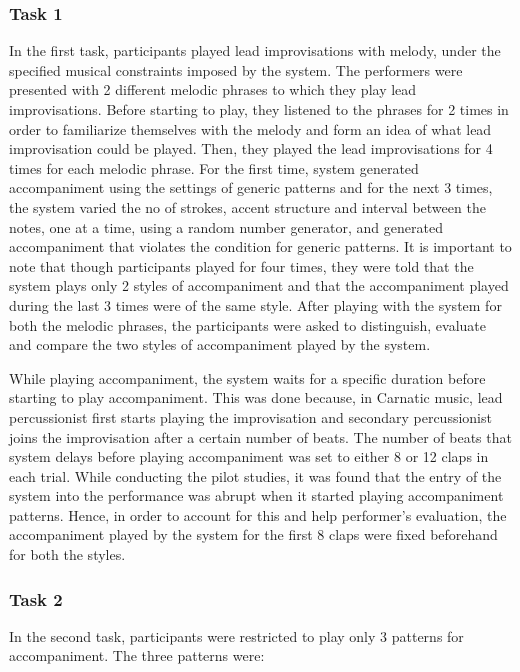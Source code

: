 \subsubsection{Task 1}

In the first task, participants played lead improvisations with melody, under the specified musical constraints imposed by the system. The performers were presented with 2 different melodic phrases to which they play lead improvisations. Before starting to play, they listened to the phrases for 2 times in order to familiarize themselves with the melody and form an idea of what lead improvisation could be played. Then, they played the lead improvisations for 4 times for each melodic phrase. For the first time, system generated accompaniment using the settings of generic patterns and for the next 3 times, the system varied the no of strokes, accent structure and interval between the notes, one at a time, using a random number generator, and generated accompaniment that violates the condition for generic patterns. It is important to note that though participants played for four times, they were told that the system plays only 2 styles of accompaniment and that the accompaniment played during the last 3 times were of the same style. After playing with the system for both the melodic phrases, the participants were asked to distinguish, evaluate and compare the two styles of accompaniment played by the system. 

While playing accompaniment, the system waits for a specific duration before starting to play accompaniment. This was done because, in Carnatic music, lead percussionist first starts playing the improvisation and secondary percussionist joins the improvisation after a certain number of beats. The number of beats that system delays before playing accompaniment was set to either 8 or 12 claps in each trial. While conducting the pilot studies, it was found that the entry of the system into the performance was abrupt when it started playing accompaniment patterns. Hence, in order to account for this and help performer's evaluation, the accompaniment played by the system for the first 8 claps were fixed beforehand for both the styles. 

\subsubsection{Task 2}

In the second task, participants were restricted to play only 3 patterns for accompaniment. The three patterns were:

